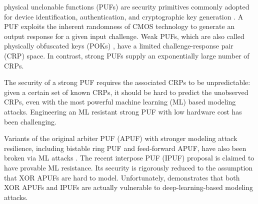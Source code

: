  physical unclonable functions (PUFs) are security primitives commonly adopted for device identification, authentication, and cryptographic key generation \cite{suh2007physical}.
A PUF exploits the inherent randomness of CMOS technology to generate an output response for a given input challenge. 
Weak PUFs, which are also called physically obfuscated keys (POKs) \cite{herder2017trapdoor}, have a limited challenge-response pair (CRP) space. 
In contrast, strong PUFs supply an exponentially large number of CRPs.

The security of a strong PUF requires the associated CRPs to be unpredictable: given a certain set of known CRPs, it should be hard to predict the unobserved CRPs, even with the most powerful machine learning (ML) based modeling attacks. 
Engineering an ML resistant strong PUF with low hardware cost has been challenging. 

Variants of the original arbiter PUF (APUF) with stronger modeling attack resilience, including bistable ring PUF and feed-forward APUF, %
have also been broken via  ML attacks \cite{schuster2014evaluation, ruhrmair2010modeling}. 
The recent interpose PUF (IPUF) \cite{nguyen2019interpose} proposal is claimed to have provable ML resistance. 
Its security is rigorously reduced to the assumption that XOR APUFs are hard to model. 
Unfortunately, \cite{DBLP:journals/iacr/SantikellurBC19} demonstrates that both XOR APUFs and IPUFs are actually vulnerable to deep-learning-based modeling attacks.


